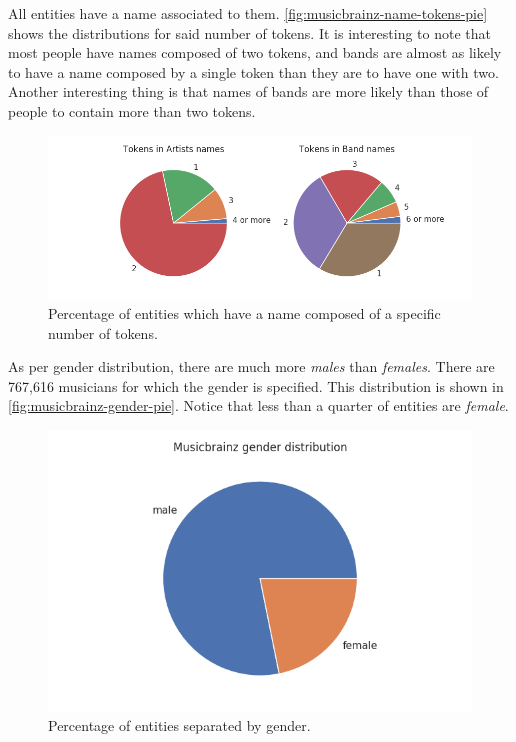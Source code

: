 \documentclass[epsfig,a4paper,11pt,titlepage,twoside,openany]{book}
\begin{document}
All entities have a name associated to them. \autoref{fig:musicbrainz-name-tokens-pie} shows the distributions for said number of tokens. It is interesting to note that most people have names composed of two tokens, and bands are almost as likely to have a name composed by a single token than they are to have one with two. Another interesting thing is that names of bands are more likely than those of people to contain more than two tokens.

\begin{figure}[]
  \centering \includegraphics[width=\textwidth]{musicbrainz_token_names_entities} 
  \caption{Percentage of entities which have a name composed of a specific number of tokens.}
  \label{fig:musicbrainz-name-tokens-pie}
\end{figure}

As per gender distribution, there are much more \textit{males} than \textit{females}. There are 767,616 musicians for which the gender is specified. This distribution is shown in \autoref{fig:musicbrainz-gender-pie}. Notice that less than a quarter of entities are \textit{female}.

\begin{figure}[]
  \centering \includegraphics[width=\textwidth]{musicbrainz_gender_pieplot} 
  \caption{Percentage of entities separated by gender.}
  \label{fig:musicbrainz-gender-pie}
\end{figure}
\end{document}
